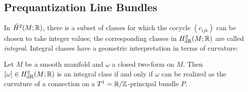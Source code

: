 \documentclass[parskip=half]{scrartcl}
\begin{document}
\subsection{Prequantization Line Bundles}

\begin{onboard}
In $\check H^2(M;\mathbb{R})$, there is a subset of classes for which the cocycle $(c_{ijk})$ can be chosen to take integer values; the corresponding classes in $H^2_\text{dR}(M;\mathbb{R})$ are called \emph{integral}. Integral classes have a geometric interpretation in terms of curvature:
\end{onboard}

\begin{onboard}
\begin{prop}
	Let $M$ be a smooth manifold and $\omega$ a closed two-form on $M$. Then $[\omega]\in H^2_\text{dR}(M;\mathbb{R})$ is an integral class if and only if $\omega$ can be realized as the curvature of a connection on a $T^1=\mathbb{R}/\mathbb{Z}$-principal bundle $P$.
\end{prop}
\end{onboard}
\end{document}

